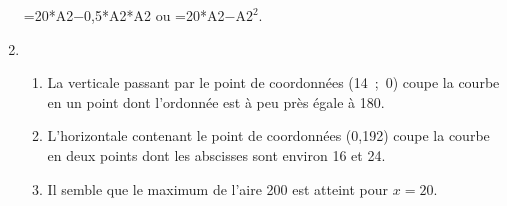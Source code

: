 \begin{enumerate}

=20*A2$-$0,5*A2*A2 ou =20*A2$-$A$2^2$.
\item %

%

	\begin{enumerate}
		\item %
La verticale passant par le point de coordonnées (14~;~0) coupe la courbe en un point dont l'ordonnée est à peu près égale à 180. 
		\item %
L'horizontale contenant le point de coordonnées (0,192) coupe la courbe en deux points dont les abscisses sont environ 16 et 24.
		\item %
Il semble que le maximum de l'aire 200 est atteint pour $x = 20$.


\end{enumerate}
\end{enumerate}
